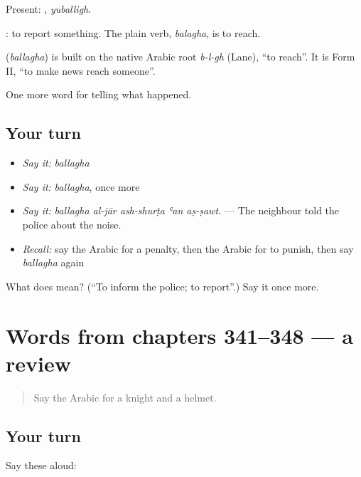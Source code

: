 Present: , \emph{yuballigh}.

 : to report something. The plain verb, \emph{balagha}, is to reach.

\begin{cousinweb}
\textbf{} (\emph{ballagha}) is built on the native Arabic root \emph{b-l-gh} (Lane), \textquotedblleft{}to reach\textquotedblright{}. It is Form II, \textquotedblleft{}to make news reach someone\textquotedblright{}.
\end{cousinweb}

\begin{grammarlens}[title={What you've built}]
One more word for telling what happened.
\end{grammarlens}

\subsection*{Your turn}
\begin{itemize}
\raggedright
  \item \emph{Say it:} \emph{ballagha}
  \item \emph{Say it:} \emph{ballagha}, once more
  \item \emph{Say it:} \emph{ballagha al-jār ash-shurṭa ʿan aṣ-ṣawt.} — The neighbour told the police about the noise.
  \item \emph{Recall:} say the Arabic for a penalty, then the Arabic for to punish, then say \emph{ballagha} again
\end{itemize}

\begin{tcolorbox}[breakable,colback=teal!4,colframe=teal!35!black,title={Before you move on}]
What does  mean? (\textquotedblleft{}To inform the police; to report\textquotedblright{}.) Say it once more.
\end{tcolorbox}
\section[(dialogue)]{Words from chapters 341–348 — a review}

\label{lesson:AR-R348-review-341-348}



\begin{quote}
Say the Arabic for a knight and a helmet.
\end{quote}

\subsection*{Your turn}
Say these aloud:


